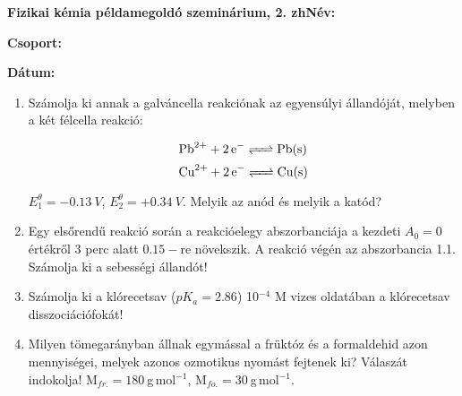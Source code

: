 \documentclass[a4paper, 11pt]{article}
\begin{document}
\textbf{Fizikai kémia példamegoldó szeminárium, 2. zh}\hfill \textbf{Név:}

\hfill \textbf{Csoport:}

\hfill \textbf{Dátum:}

\thispagestyle{empty}

\begin{enumerate}

\item Számolja ki annak a galváncella reakciónak az egyensúlyi állandóját, melyben a két félcella reakció:
 
\begin{equation}
        \ce{Pb^{2+} + 2e^- <=> Pb(s)}
\end{equation}
\begin{equation}
        \ce{Cu^{2+} + 2e^- <=> Cu(s)}
\end{equation}

$E_1^\theta=-0.13~V$, $E_2^\theta=+0.34~V$. Melyik az anód és melyik a katód? 

\item Egy elsőrendű reakció során a reakcióelegy abszorbanciája a kezdeti $A_0=0$ értékről 3 perc alatt $0.15-$re növekszik. A reakció végén az abszorbancia 1.1. Számolja ki a sebességi állandót!

\item Számolja ki a klórecetsav ($pK_a=2.86$) 10$^{-4}$ M vizes oldatában a klórecetsav disszociációfokát!  

\item Milyen tömegarányban állnak egymással a früktóz és a formaldehid azon mennyiségei, melyek azonos ozmotikus nyomást fejtenek ki? Válaszát indokolja! M$_{fr.}=180~$g$\,$mol$^{-1}$, M$_{fo.}=30~$g$\,$mol$^{-1}$.

\end{enumerate}
\end{document}
